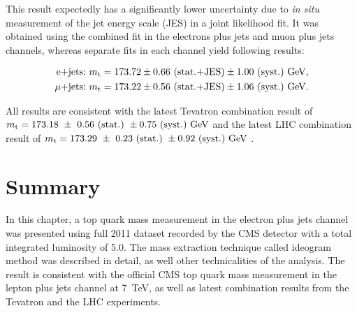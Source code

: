 This result expectedly has a significantly lower uncertainty due to \textit{in situ} measurement of the jet energy scale
(JES) in a joint likelihood fit. It was obtained using the combined fit in the electrons plus jets and muon plus jets
channels, whereas separate fits in each channel yield following results:

\begin{equation}
\begin{split}
	\textrm{e+jets:}~m_\mathrm{t} = 173.72 \pm 0.66~\textrm{(stat.+JES)} \pm 1.00~\textrm{(syst.)}~\textrm{GeV},\\
	\mu\textrm{+jets:}~m_\mathrm{t} = 173.22 \pm 0.56~\textrm{(stat.+JES)} \pm 1.06~\textrm{(syst.)}~\textrm{GeV}.\\
	\label{final_result_official_emujets}
\end{split}
\end{equation}

All results are consistent with the latest Tevatron combination result of $m_\mathrm{t} = 173.18\ \pm\ 0.56\ \textrm{(stat.)}\
\pm 0.75\ \textrm{(syst.)}\ \textrm{GeV}$ \autocite{tevatron_top_mass_combination} and the latest LHC combination result
of $m_\mathrm{t} = 173.29\ \pm\ 0.23\ \textrm{(stat.)}\ \pm 0.92\ \textrm{(syst.)}\ \textrm{GeV}$
\autocite{LHC_top_mass_combination}.


\newpage
\section{Summary}
\label{s_top_mass:summary}
In this chapter, a top quark mass measurement in the electron plus jets channel was presented using full 2011 dataset
recorded by the CMS detector with a total integrated luminosity of \SI{5.0}{\fbinv}. The mass extraction technique
called ideogram method was described in detail, as well other technicalities of the analysis. The result is consistent
with the official CMS top quark mass measurement in the lepton plus jets channel at \SI{7}{\TeV}, as well as latest
combination results from the Tevatron and the LHC experiments.





